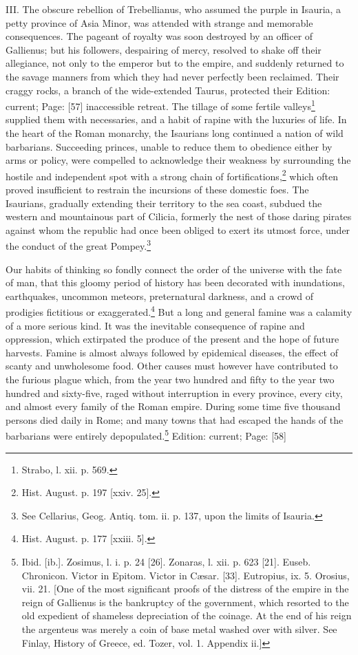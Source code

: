 III. The obscure rebellion of Trebellianus, who assumed the purple in Isauria, a petty province of Asia Minor, was attended with strange and memorable consequences. The pageant of royalty was soon destroyed by an officer of Gallienus; but his followers, despairing of mercy, resolved to shake off their allegiance, not only to the emperor but to the empire, and suddenly returned to the savage manners from which they had never perfectly been reclaimed. Their craggy rocks, a branch of the wide-extended Taurus, protected their Edition: current; Page: [57] inaccessible retreat. The tillage of some fertile valleys\footnote{Strabo, l. xii. p. 569.} supplied them with necessaries, and a habit of rapine with the luxuries of life. In the heart of the Roman monarchy, the Isaurians long continued a nation of wild barbarians. Succeeding princes, unable to reduce them to obedience either by arms or policy, were compelled to acknowledge their weakness by surrounding the hostile and independent spot with a strong chain of fortifications,\footnote{Hist. August. p. 197 [xxiv. 25].} which often proved insufficient to restrain the incursions of these domestic foes. The Isaurians, gradually extending their territory to the sea coast, subdued the western and mountainous part of Cilicia, formerly the nest of those daring pirates against whom the republic had once been obliged to exert its utmost force, under the conduct of the great Pompey.\footnote{See Cellarius, Geog. Antiq. tom. ii. p. 137, upon the limits of Isauria.}

Our habits of thinking so fondly connect the order of the universe with the fate of man, that this gloomy period of history has been decorated with inundations, earthquakes, uncommon meteors, preternatural darkness, and a crowd of prodigies fictitious or exaggerated.\footnote{Hist. August. p. 177 [xxiii. 5].} But a long and general famine was a calamity of a more serious kind. It was the inevitable consequence of rapine and oppression, which extirpated the produce of the present and the hope of future harvests. Famine is almost always followed by epidemical diseases, the effect of scanty and unwholesome food. Other causes must however have contributed to the furious plague which, from the year two hundred and fifty to the year two hundred and sixty-five, raged without interruption in every province, every city, and almost every family of the Roman empire. During some time five thousand persons died daily in Rome; and many towns that had escaped the hands of the barbarians were entirely depopulated.\footnote{Ibid. [ib.]. Zosimus, l. i. p. 24 [26]. Zonaras, l. xii. p. 623 [21]. Euseb. Chronicon. Victor in Epitom. Victor in Cæsar. [33]. Eutropius, ix. 5. Orosius, vii. 21. [One of the most significant proofs of the distress of the empire in the reign of Gallienus is the bankruptcy of the government, which resorted to the old expedient of shameless depreciation of the coinage. At the end of his reign the argenteus was merely a coin of base metal washed over with silver. See Finlay, History of Greece, ed. Tozer, vol. 1. Appendix ii.]}
Edition: current; Page: [58]

